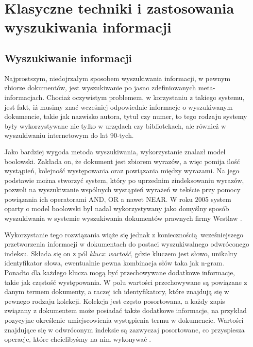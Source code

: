 \chapter{Klasyczne techniki i zastosowania wyszukiwania informacji}
\label{chap:pierwszy}

\section{Wyszukiwanie informacji}

Najprostszym, niedojrzałym sposobem wyszukiwania informacji, w pewnym zbiorze dokumentów, jest wyszukiwanie po jasno zdefiniowanych meta-informacjach. Chociaż oczywistym problemem, w korzystaniu z takiego systemu, jest fakt, iż musimy znać wcześniej odpowiednie informacje o wyszukiwanym dokumencie, takie jak nazwisko autora, tytuł czy numer, to tego rodzaju systemy były wykorzystywane nie tylko w urzędach czy bibliotekach, ale również w wyszukiwaniu internetowym do lat 90-tych.\newline

Jako bardziej wygoda metoda wyszukiwania, wykorzystanie znalazł model boolowski. Zakłada on, że dokument jest zbiorem wyrazów, a więc pomija ilość wystąpień, kolejność występowania oraz powiązania między wyrazami. Na jego podstawie można stworzyć system, który po uprzednim zindeksowaniu wyrazów, pozwoli na wyszukiwanie wspólnych
wystąpień wyrażeń w tekście przy pomocy powiązania ich operatorami AND, OR a nawet NEAR. W roku
2005 system oparty o model boolowski był nadal wykorzystywany jako domyślny sposób
wyszukiwania w systemie wyszukiwania dokumentów prawnych firmy Westlaw \autocite[s. 38-56]{introtoinformationretrieval}. \newline\newline

Wykorzystanie tego rozwiązania wiąże się jednak z koniecznością wcześniejszego przetworzenia informacji w dokumentach do postaci wyszukiwalnego odwróconego indeksu. Składa
się on z pól {\it klucz}: {\it wartość}, gdzie kluczem jest słowo, unikalny identyfikator słowa, ewentualnie
pewna kombinacja słów taka jak n-gram. Ponadto dla każdego klucza mogą być przechowywane
dodatkowe informacje, takie jak częstość występowania. W polu wartości przechowywane są powiązane z danym termem dokumenty, a raczej ich identyfikatory, które znajdują się w pewnego
rodzaju kolekcji. Kolekcja jest często posortowana, a każdy zapis związany z dokumentem może
posiadać także dodatkowe informacje, na przykład pozycyjne określenie umiejscowienia
wystąpienia termu w dokumencie. Wartości znajdujące się w odwróconym indeksie są zazwyczaj posortowane, co
przyspiesza operacje, które chcielibyśmy na nim wykonywać \autocite[s. 104-122]{introtoinformationretrieval}.\newline

